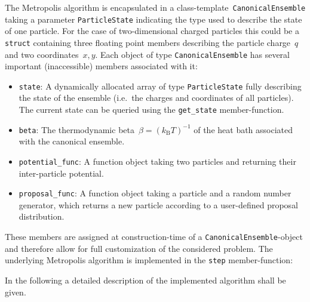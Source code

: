 \documentclass[11pt, a4paper]{article}
\numberwithin{equation}{section}
\begin{document}
The Metropolis algorithm is encapsulated in a class-template~\texttt{CanonicalEnsemble} taking a parameter \texttt{ParticleState} indicating the type used to describe the state of one particle.
For the case of two-dimensional charged particles this could be a \texttt{struct} containing three floating point members describing the particle charge~$q$ and two coordinates~$x, y$.
Each object of type \texttt{CanonicalEnsemble} has several important (inaccessible) members associated with it:
\begin{itemize}
	\item \texttt{state}:
		A dynamically allocated array of type \texttt{ParticleState} fully describing the state of the ensemble (i.e.\ the charges and coordinates of all particles).
		The current state can be queried using the \texttt{get\_state} member-function.
	
	\item \texttt{beta}:
		The thermodynamic beta~$\beta = (k_\mathrm{B} T)^{-1}$ of the heat bath associated with the canonical ensemble.
	
	\item \texttt{potential\_func}:
		A function object taking two particles and returning their inter-particle potential.
	
	\item \texttt{proposal\_func}:
		A function object taking a particle and a random number generator, which returns a new particle according to a user-defined proposal distribution.
\end{itemize}
These members are assigned at construction-time of a \texttt{CanonicalEnsemble}-object and therefore allow for full customization of the considered problem.
The underlying Metropolis algorithm is implemented in the \texttt{step} member-function:

In the following a detailed description of the implemented algorithm shall be given.
\end{document}
